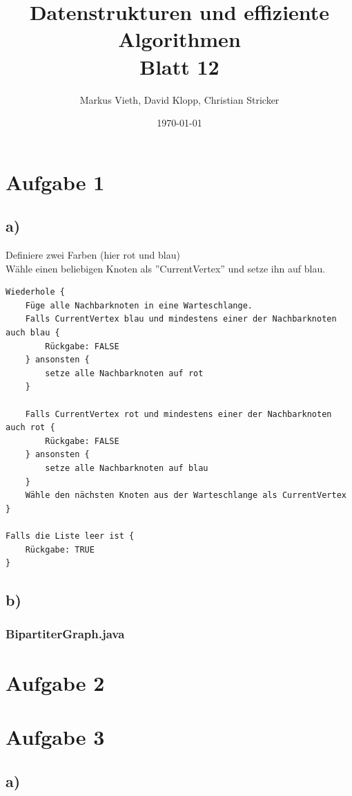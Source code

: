 \documentclass[a4paper,11pt,twoside]{scrartcl}
\title{Datenstrukturen und effiziente Algorithmen\\ Blatt 12}
\author{Markus Vieth, David Klopp, Christian Stricker}
\date{\today}
\begin{document}
\maketitle
\cleardoublepage
\pagestyle{myheadings}

\section*{Aufgabe 1}
\subsection*{a)} 
Definiere zwei Farben (hier rot und blau)\\
Wähle einen beliebigen Knoten als ''CurrentVertex'' und setze ihn auf blau.\\

\begin{lstlisting}
Wiederhole {
	Füge alle Nachbarknoten in eine Warteschlange.
	Falls CurrentVertex blau und mindestens einer der Nachbarknoten auch blau {
		Rückgabe: FALSE
	} ansonsten {
		setze alle Nachbarknoten auf rot
	}
	
	Falls CurrentVertex rot und mindestens einer der Nachbarknoten auch rot {
		Rückgabe: FALSE
	} ansonsten {
		setze alle Nachbarknoten auf blau
	}
	Wähle den nächsten Knoten aus der Warteschlange als CurrentVertex
}

Falls die Liste leer ist {
	Rückgabe: TRUE
}
\end{lstlisting}
\subsection*{b)}
\subsubsection*{BipartiterGraph.java}

\section*{Aufgabe 2}


\section*{Aufgabe 3}
\subsection*{a)} 
\end{document}
